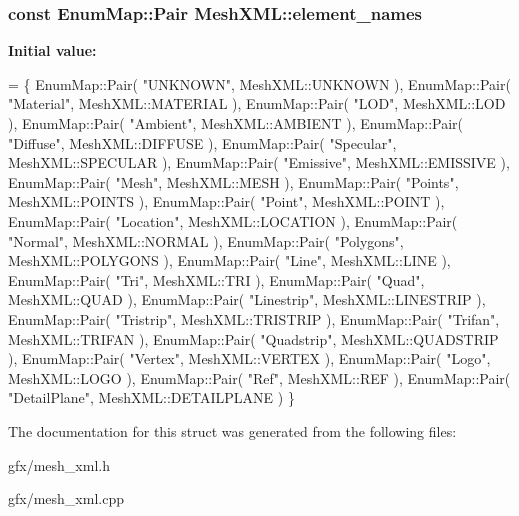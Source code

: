 \subsubsection[{\texorpdfstring{element\+\_\+names}{element_names}}]{\setlength{\rightskip}{0pt plus 5cm}const Enum\+Map\+::\+Pair Mesh\+X\+M\+L\+::element\+\_\+names\hspace{0.3cm}{\ttfamily [static]}}\hypertarget{structMeshXML_a3ebaf89d2deb27a3c0d0601913dc666b}{}\label{structMeshXML_a3ebaf89d2deb27a3c0d0601913dc666b}
{\bfseries Initial value\+:}
\begin{DoxyCode}
= \{
    EnumMap::Pair( \textcolor{stringliteral}{"UNKNOWN"},     MeshXML::UNKNOWN ),
    EnumMap::Pair( \textcolor{stringliteral}{"Material"},    MeshXML::MATERIAL ),
    EnumMap::Pair( \textcolor{stringliteral}{"LOD"},         MeshXML::LOD ),
    EnumMap::Pair( \textcolor{stringliteral}{"Ambient"},     MeshXML::AMBIENT ),
    EnumMap::Pair( \textcolor{stringliteral}{"Diffuse"},     MeshXML::DIFFUSE ),
    EnumMap::Pair( \textcolor{stringliteral}{"Specular"},    MeshXML::SPECULAR ),
    EnumMap::Pair( \textcolor{stringliteral}{"Emissive"},    MeshXML::EMISSIVE ),
    EnumMap::Pair( \textcolor{stringliteral}{"Mesh"},        MeshXML::MESH ),
    EnumMap::Pair( \textcolor{stringliteral}{"Points"},      MeshXML::POINTS ),
    EnumMap::Pair( \textcolor{stringliteral}{"Point"},       MeshXML::POINT ),
    EnumMap::Pair( \textcolor{stringliteral}{"Location"},    MeshXML::LOCATION ),
    EnumMap::Pair( \textcolor{stringliteral}{"Normal"},      MeshXML::NORMAL ),
    EnumMap::Pair( \textcolor{stringliteral}{"Polygons"},    MeshXML::POLYGONS ),
    EnumMap::Pair( \textcolor{stringliteral}{"Line"},        MeshXML::LINE ),
    EnumMap::Pair( \textcolor{stringliteral}{"Tri"},         MeshXML::TRI ),
    EnumMap::Pair( \textcolor{stringliteral}{"Quad"},        MeshXML::QUAD ),
    EnumMap::Pair( \textcolor{stringliteral}{"Linestrip"},   MeshXML::LINESTRIP ),
    EnumMap::Pair( \textcolor{stringliteral}{"Tristrip"},    MeshXML::TRISTRIP ),
    EnumMap::Pair( \textcolor{stringliteral}{"Trifan"},      MeshXML::TRIFAN ),
    EnumMap::Pair( \textcolor{stringliteral}{"Quadstrip"},   MeshXML::QUADSTRIP ),
    EnumMap::Pair( \textcolor{stringliteral}{"Vertex"},      MeshXML::VERTEX ),
    EnumMap::Pair( \textcolor{stringliteral}{"Logo"},        MeshXML::LOGO ),
    EnumMap::Pair( \textcolor{stringliteral}{"Ref"},         MeshXML::REF ),
    EnumMap::Pair( \textcolor{stringliteral}{"DetailPlane"}, MeshXML::DETAILPLANE )
\}
\end{DoxyCode}


The documentation for this struct was generated from the following files\+:\begin{DoxyCompactItemize}
\item 
gfx/mesh\+\_\+xml.\+h\item 
gfx/mesh\+\_\+xml.\+cpp\end{DoxyCompactItemize}
